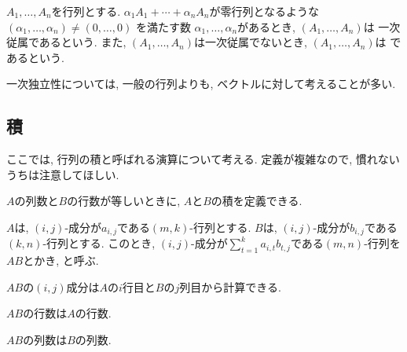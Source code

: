 \begin{definition}
  $A_1,\ldots, A_n$を行列とする.
  $\alpha_1A_1+\cdots+\alpha_n A_n$が零行列となるような
  $(\alpha_1,\ldots,\alpha_n)\neq (0,\ldots,0)$
  を満たす数
  $\alpha_1,\ldots,\alpha_n$があるとき,
  $(A_1,\ldots,A_n)$は
  一次従属であるという.
  また,
  $(A_1,\ldots,A_n)$は一次従属でないとき,
  $(A_1,\ldots,A_n)$は
  であるという.
\end{definition}


\begin{remark}
  一次独立性については,
  一般の行列よりも, ベクトルに対して考えることが多い.
\end{remark}



\subsection{積}
ここでは, 行列の積と呼ばれる演算について考える.
定義が複雑なので,
慣れないうちは注意してほしい.


$A$の列数と$B$の行数が等しいときに,
$A$と$B$の積を定義できる.
\begin{definition}
  \label{def:op:prod}
  $A$は, $(i,j)$-成分が$a_{i,j}$である$(m,k)$-行列とする.
  $B$は, $(i,j)$-成分が$b_{i,j}$である$(k,n)$-行列とする.
  このとき,
  $(i,j)$-成分が$\sum_{t=1}^{k}a_{i,t}b_{t,j}$である$(m,n)$-行列を$AB$とかき,
  と呼ぶ. 
\end{definition}
\begin{remark}
  $AB$の$(i,j)$成分は$A$の$i$行目と$B$の$j$列目から計算できる.
\end{remark}
\begin{remark}
  $AB$の行数は$A$の行数.
\end{remark}
\begin{remark}
  $AB$の列数は$B$の列数.
\end{remark}



